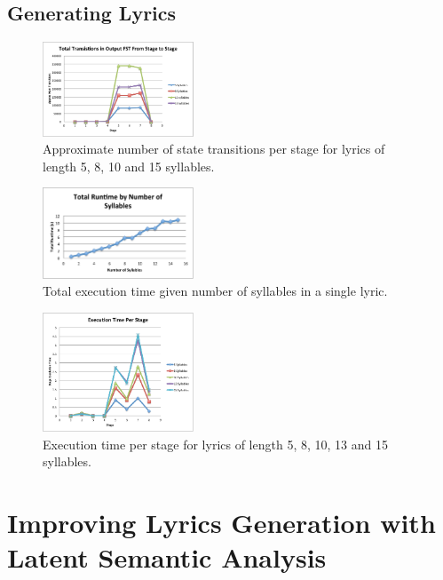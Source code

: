 \documentclass{vgtc}                          %
\begin{document}
\subsection{Generating Lyrics}
\begin{figure}[t]
\centering
\includegraphics[width=0.4\textwidth]{images/pdf/transitions_per_stage.pdf}
\caption{Approximate number of state transitions per stage for lyrics of length 5, 8, 10 and 15 syllables.}
\label{fig:perf2}
\end{figure}

\begin{figure}[t]
\centering
\includegraphics[width=0.4\textwidth]{images/pdf/runtime_by_syllables.pdf}
\caption{Total execution time given number of syllables in a single lyric.}
\label{fig:perf2}
\end{figure}

\begin{figure}[t]
\centering
\includegraphics[width=0.4\textwidth]{images/pdf/runtime_per_stage.pdf}
\caption{Execution time per stage for lyrics of length 5, 8, 10, 13 and 15 syllables.}
\label{fig:perf2}
\end{figure}
\section{Improving Lyrics Generation with Latent Semantic Analysis}
\end{document}
